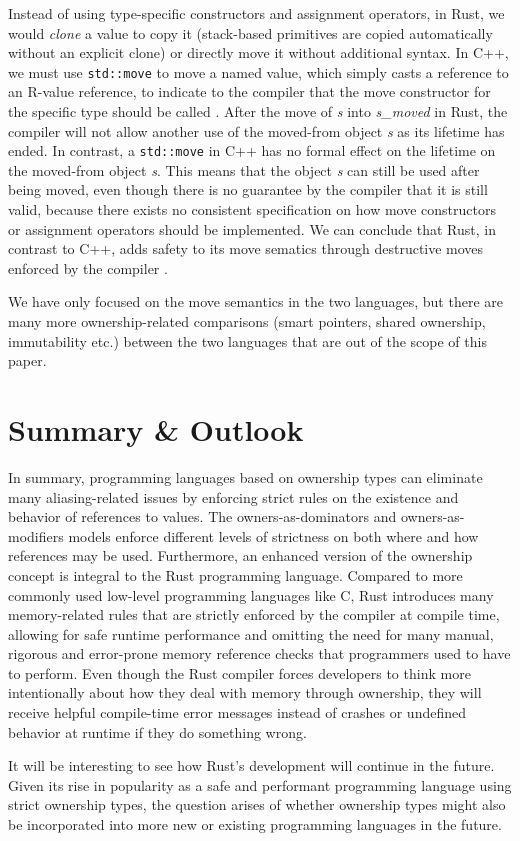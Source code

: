 \documentclass[sigplan,11pt,nonacm]{acmart}
\begin{document}
Instead of using type-specific constructors and assignment operators, in Rust, we would \emph{clone} a value to copy it (stack-based primitives are copied automatically without an explicit clone) or directly move it without additional syntax.
In C++, we must use \verb|std::move| to move a named value, which simply casts a reference to an R-value reference, to indicate to the compiler that the move constructor for the specific type should be called \cite{cpp-rust-ownership}.
After the move of \emph{s} into \emph{s\_moved} in Rust, the compiler will not allow another use of the moved-from object \emph{s} as its lifetime has ended.
In contrast, a \verb|std::move| in C++ has no formal effect on the lifetime on the moved-from object \emph{s}.
This means that the object \emph{s} can still be used after being moved, even though there is no guarantee by the compiler that it is still valid, because there exists no consistent specification on how move constructors or assignment operators should be implemented.
We can conclude that Rust, in contrast to C++, adds safety to its move sematics through destructive moves enforced by the compiler \cite{cpp-rust-ownership}.

We have only focused on the move semantics in the two languages, but there are many more ownership-related comparisons (smart pointers, shared ownership, immutability etc.) between the two languages that are out of the scope of this paper.


\section{Summary \& Outlook}
\label{sec:summary}

In summary, programming languages based on ownership types can eliminate many aliasing-related issues by enforcing strict rules on the existence and behavior of references to values.
The owners-as-dominators and owners-as-modifiers models enforce different levels of strictness on both where and how references may be used.
Furthermore, an enhanced version of the ownership concept is integral to the Rust programming language.
Compared to more commonly used low-level programming languages like C, Rust introduces many memory-related rules that are strictly enforced by the compiler at compile time, allowing for safe runtime performance and omitting the need for many manual, rigorous and error-prone memory reference checks that programmers used to have to perform.
Even though the Rust compiler forces developers to think more intentionally about how they deal with memory through ownership, they will receive helpful compile-time error messages instead of crashes or undefined behavior at runtime if they do something wrong.

It will be interesting to see how Rust's development will continue in the future.
Given its rise in popularity as a safe and performant programming language using strict ownership types, the question arises of whether ownership types might also be incorporated into more new or existing programming languages in the future.



\end{document}
